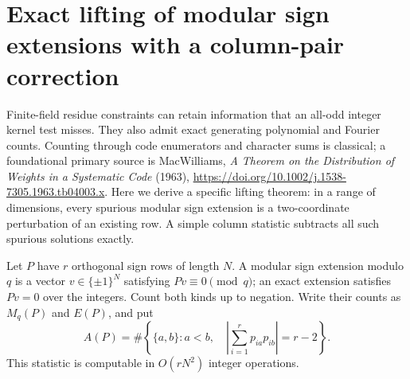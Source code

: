 \section{Exact lifting of modular sign extensions with a column-pair correction}
\label{sec:modular-sign-lifting}

Finite-field residue constraints can retain information that an
all-odd integer kernel test misses. They also admit exact generating
polynomial and Fourier counts. Counting through code enumerators and
character sums is classical; a foundational primary source is
MacWilliams, \emph{A Theorem on the Distribution of Weights in a
Systematic Code} (1963),
\url{https://doi.org/10.1002/j.1538-7305.1963.tb04003.x}.
Here we derive a specific lifting theorem: in a range of dimensions,
every spurious modular sign extension is a two-coordinate perturbation
of an existing row. A simple column statistic subtracts all such
spurious solutions exactly.

Let $P$ have $r$ orthogonal sign rows of length $N$. A modular sign
extension modulo $q$ is a vector $v\in\{\pm1\}^N$ satisfying
$Pv\equiv0\pmod q$; an exact extension satisfies $Pv=0$ over the
integers. Count both kinds up to negation. Write their counts as
$M_q(P)$ and $E(P)$, and put
\[
 A(P)=\#\left\{\{a,b\}:a<b,\quad
 \left|\sum_{i=1}^r p_{ia}p_{ib}\right|=r-2\right\}.
\]
This statistic is computable in $O(rN^2)$ integer operations.


